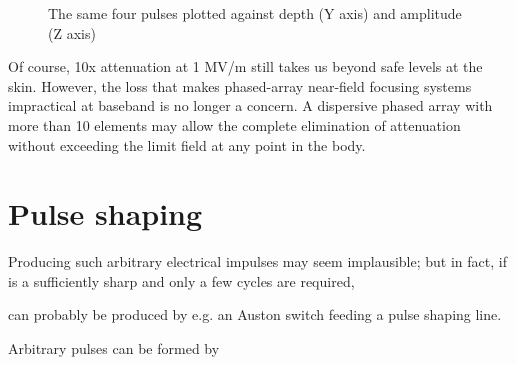 \documentclass[paper.tex]{subfiles}
\begin{document}
\begin{figure}[H]
	
	\caption{The same four pulses plotted against depth (Y axis) and amplitude (Z axis)}
\end{figure}

Of course, 10x attenuation at 1 MV/m still takes us beyond safe levels at the skin. However, the loss that makes phased-array near-field focusing systems impractical at baseband is no longer a concern. A dispersive phased array with more than 10 elements may allow the complete elimination of attenuation without exceeding the limit field at any point in the body. 


\section{Pulse shaping}

Producing such arbitrary electrical impulses may seem implausible; but in fact, if is a sufficiently sharp and only a few cycles are required, 

can probably be produced by e.g. an Auston switch feeding a pulse shaping line.

Arbitrary pulses can be formed by 
\end{document}
